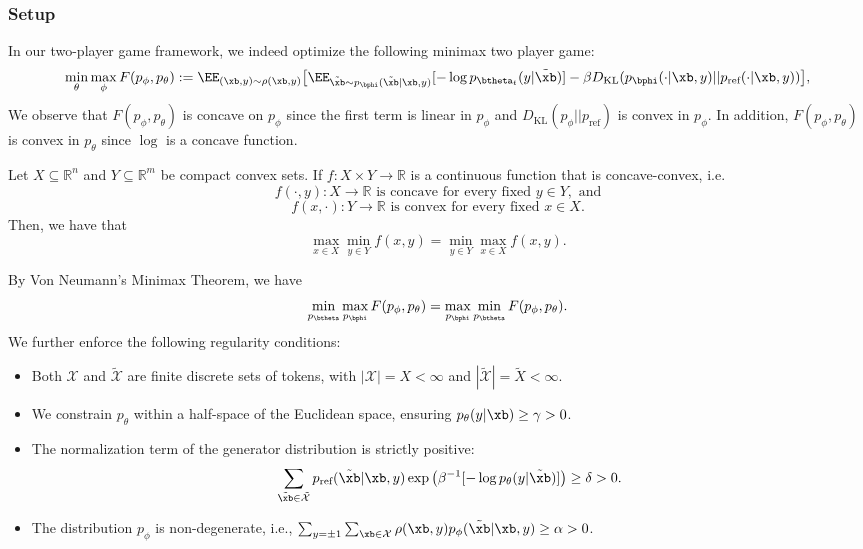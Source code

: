 \subsubsection{Setup}
In our two-player game framework, we indeed optimize the following minimax two player game:
\begin{align*}
    \min_\theta \max_\phi F(p_{\phi}, p_{\theta}) :=  \EE_{(\xb,y)\sim\rho(\xb,y)} \big[ \EE_{\tilde{\xb}\sim p_{\bphi}(\tilde{\xb} | \xb, y)}[- \log p_{\btheta_t}(y|\tilde{\xb})] - \beta D_{\text{KL}}(p_{\bphi}(\cdot|\xb,y) || p_{\text{ref}}(\cdot|\xb,y)) \big],
\end{align*}
We observe that $F(p_{\phi}, p_{\theta})$ is concave on $p_{\phi}$ since the first term is linear in $p_{\phi}$ and $D_{\text{KL}}(p_{\phi} || p_{\text{ref}})$ is convex in $p_{\phi}$. In addition, $F(p_{\phi}, p_{\theta})$ is convex in $p_\theta$ since $\log$ is a concave function.
\begin{theorem}
Let \( X \subseteq \mathbb{R}^n \) and \( Y \subseteq \mathbb{R}^m \) be {compact convex} sets. If \( f: X \times Y \to \mathbb{R} \) is a continuous function that is concave-convex, i.e.
\[
f(\cdot, y): X \to \mathbb{R} \text{ is } {\text{concave}} \text{ for every fixed } y \in Y, \text{ and}
\]
\[
f(x, \cdot): Y \to \mathbb{R} \text{ is } {\text{convex}} \text{ for every fixed } x \in X.
\]
Then, we have that
\[
\max_{x \in X} \min_{y \in Y} f(x, y) = \min_{y \in Y} \max_{x \in X} f(x, y).
\]

\end{theorem}
By Von Neumann's Minimax Theorem, we have 
\begin{align*}
    \min_{p_{\btheta}} \max_{p_{\bphi}} F(p_{\phi}, p_{\theta}) = \max_{p_{\bphi}} \min_{p_{\btheta}}  F(p_{\phi}, p_{\theta}).
\end{align*}
We further enforce the following regularity conditions:
\begin{itemize} \item Both $\mathcal{X}$ and $\tilde{\mathcal{X}}$ are finite discrete sets of tokens, with $|\mathcal{X}| = X < \infty$ and $|\tilde{\mathcal{X}}| = \tilde{X} < \infty$. \item We constrain $p_\theta$ within a half-space of the Euclidean space, ensuring $p_\theta(y|\xb) \ge \gamma > 0$. \item The normalization term of the generator distribution is strictly positive:
    \[\sum_{\tilde\xb\in\tilde{\mathcal{X}}} p_{\text{ref}}(\tilde\xb|\xb,y) \exp\big(\beta^{-1} [-\log p_{\theta}(y|\tilde{\xb})] \big) \ge \delta > 0.\]
\item The distribution $p_\phi$ is non-degenerate, i.e., $ \sum_{y=\pm 1}\sum_{\xb \in \mathcal{X}} \rho(\xb, y) p_{\phi}(\tilde{\xb}|\xb,y) \ge \alpha >0$.
\end{itemize}
